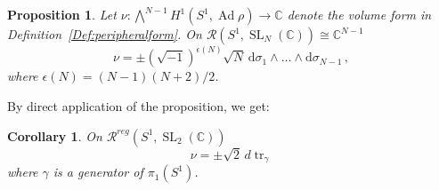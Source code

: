 \documentclass[11pt]{article}
\newtheorem{prop}[theo]{Proposition}
\newtheorem{coro}[theo]{Corollary}
\theoremstyle{definition}
\numberwithin{equation}{section}
\numberwithin{figure}{section}
\numberwithin{table}{section}
\DeclareMathOperator{\SL}{SL}
\DeclareMathOperator{\Ad}{Ad}
\DeclareMathOperator{\tr}{tr}
\newcommand{\Rcal}{\mathcal{R}}
\newcommand{\Cbb}{\mathbb{C}}
\newcommand*{\dd}{\mathrm{d}}
\begin{document}
\begin{prop}\label{prop:thetaSL}
Let $\nu\colon \bigwedge^{N-1} H^1(S^1,\Ad\rho)\to\Cbb$ denote the volume form in Definition~\ref{Def:peripheralform}. On $\Rcal(S^1, \SL_N (\Cbb))\cong\Cbb^{N-1}$
\[
\nu = \pm \left(\sqrt{-1}\right)^{\epsilon(N)} \sqrt N\, \dd\sigma_1\wedge\dots\wedge \dd\sigma_{N-1}\,,
\]
where $\epsilon(N)=(N-1)(N+2)/2$.
\end{prop}



By direct application of the proposition, we get:


\begin{coro}\label{cor:dtrace}
On $\Rcal^{reg}(S^1,\SL_2(\Cbb))$
\[
\nu =\pm \sqrt{2}\, d \tr_\gamma
\]
where $\gamma$ is a generator of $\pi_1(S^1)$.
\end{coro}
\end{document}
